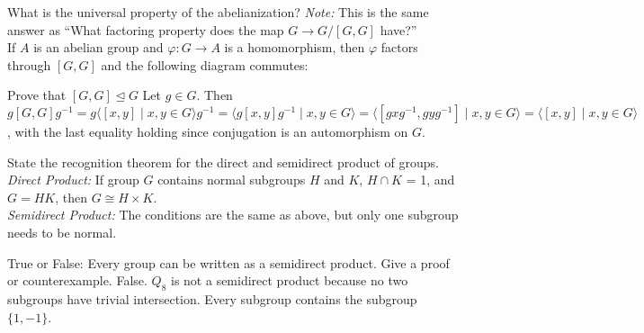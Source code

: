 \documentclass[avery5371,grid]{flashcards}
\newcommand{\inv}{^{-1}}
\let \phi \varphi
\begin{document}
\begin{flashcard}[Groups]{What is the universal property of the abelianization?}
 \emph{Note: }This is the same answer as ``What factoring property does the map $G \to G/[G,G]$ have?''\\
 
  If $A$ is an abelian group and $\phi: G \to A$ is a homomorphism, then $\phi$ factors through $[G,G]$ and the following diagram commutes:
 \begin{center}
 \end{center}
\end{flashcard}

\begin{flashcard}[Groups]{Prove that $[G,G] \trianglelefteq G$}
 Let $g \in G$. Then $g [G,G] g \inv = g \langle [x,y] \mid x,y \in G \rangle g \inv = \langle g[x,y]g \inv \mid x,y \in G \rangle = \langle [gxg \inv,gyg \inv] \mid x,y \in G \rangle = \langle [x,y] \mid x,y \in G \rangle$, with the last equality holding since conjugation is an automorphism on $G$.
\end{flashcard}

\begin{flashcard}[Groups]{State the recognition theorem for the direct and semidirect product of groups.}
 \emph{Direct Product:} If group $G$ contains normal subgroups $H$ and $K$, $H \cap K$ = 1, and $G = HK$, then $G \cong H \times K$. \\
 
 \emph{Semidirect Product:} The conditions are the same as above, but only one subgroup needs to be normal.
\end{flashcard}

\begin{flashcard}[Groups]{True or False: Every group can be written as a semidirect product. Give a proof or counterexample.}
 False. $Q_8$ is not a semidirect product because no two subgroups have trivial intersection. Every subgroup contains the subgroup $\{1, -1\}$. 
\end{flashcard}
\end{document}
